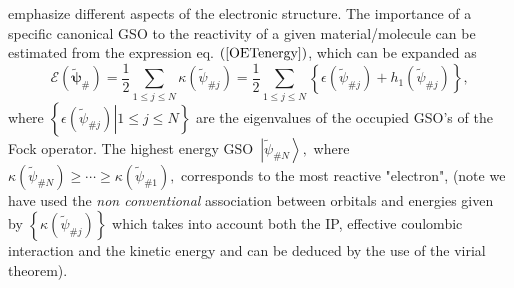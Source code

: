 \documentclass[aps,preprint]{revtex4}%
\begin{document}
emphasize different aspects of the electronic structure. The importance of a
specific canonical GSO to the reactivity of a given material/molecule can be
estimated from the expression eq. $\left(  \ref{OETenergy}\right)  $, which
can be expanded as
\begin{equation}
\mathcal{E}\left(  \boldsymbol{\tilde{\psi}}_{\#}\right)  =\frac{1}{2}%
\sum_{1\leq j\leq N}\kappa\left(  \tilde{\psi}_{\#j}\right)  =\frac{1}{2}%
\sum_{1\leq j\leq N}\left\{  \epsilon\left(  \tilde{\psi}_{\#j}\right)
+h_{1}\left(  \tilde{\psi}_{\#j}\right)  \right\}  ,\label{FockEn}%
\end{equation}
where $\left\{  \left.  \epsilon\left(  \tilde{\psi}_{\#j}\right)  \right\vert
1\leq j\leq N\right\}  $ are the eigenvalues of the occupied GSO's of the Fock
operator. The highest energy GSO\ $\left\vert \tilde{\psi}_{\#N}\right\rangle
,$ where $\kappa\left(  \tilde{\psi}_{\#N}\right)  \geq\cdots\geq\kappa\left(
\tilde{\psi}_{\#1}\right)  ,$ corresponds to the most reactive "electron",
(note we have used the \emph{non conventional} association between orbitals
and energies given by $\left\{  \kappa\left(  \tilde{\psi}_{\#j}\right)
\right\}  $ which takes into account both the IP, effective coulombic
interaction and the kinetic energy and can be deduced by the use of the virial theorem).
\end{document}
